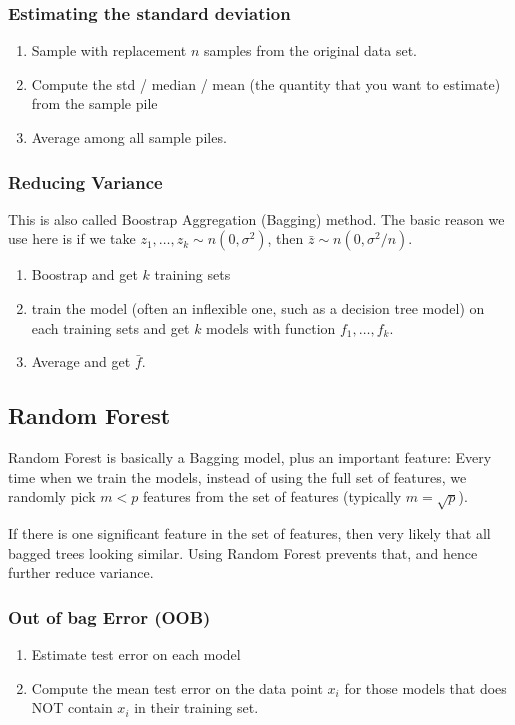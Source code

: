 \documentclass[12pt]{amsart}
\numberwithin{equation}{section}
\theoremstyle{plain}
\theoremstyle{definition}
\begin{document}
\subsubsection{Estimating the standard deviation}
\begin{enumerate}
\item Sample with replacement $n$ samples from the original data set.
\item Compute the std / median / mean (the quantity that you want to estimate) from the sample pile
\item Average among all sample piles.
\end{enumerate}

\subsubsection{Reducing Variance}
This is also called Boostrap Aggregation (Bagging) method. The basic reason we use here is if we take 
$z_1,\ldots,z_k\sim n(0,\sigma^2)$, then $\bar z \sim n(0,\sigma^2/n)$.
\begin{enumerate}
\item Boostrap and get $k$ training sets
\item train the model (often an inflexible one, such as a decision tree model) on each training sets and get $k$ models with function $f_1,\ldots, f_k$.
\item Average and get $\bar f$.
\end{enumerate}

\subsection{Random Forest}
Random Forest is basically a Bagging model, plus an important feature: Every time when we train the models, instead of using the full set of features, we randomly pick $m<p$ features from the set of features (typically $m = \sqrt{p}$).

If there is one significant feature in the set of features, then very likely that all bagged trees looking similar. Using Random Forest prevents that, and hence further reduce variance.

\subsubsection{Out of bag Error (OOB)}
\begin{enumerate}
\item Estimate test error on each model
\item Compute the mean test error on the data point $x_i$ for those models that does NOT contain $x_i$ in their training set.
\end{enumerate}
\end{document}
